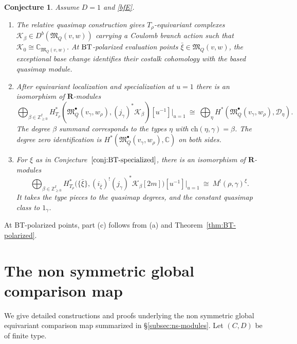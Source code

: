 \documentclass[11pt,reqno]{amsart}
\newtheorem{Conjecture}[Theorem]{Conjecture}
\theoremstyle{definition}
\theoremstyle{remark}
\def\bbC{\mathbb C}
\def\bbZ{\mathbb Z}
\def\dQ{\underline Q}
\def\bR{\mathbf R}
\def\M{\mathfrak M}
\begin{document}
\begin{Conjecture}\label{conj:BT-Microlocal}
\label{conj:BT-relative}Assume $D=1$ and \eqref{bfE}. \hfill
\begin{enumerate}[label=$\mathrm{(\alph*)}$,leftmargin=8mm]
\item
The relative quasimap construction gives $T_\rho$-equivariant complexes $\mathscr K_\beta\in D^b(\M_Q(v,w))$ 
carrying a Coulomb branch action such that $\mathscr K_0\cong\bbC_{\M_Q(v,w)}$.
At ${\rm BT}$-polarized evaluation points $\bar\xi\in \M_Q(v,w)$, the exceptional base change
identifies their costalk cohomology with the based quasimap module.
\item
After equivariant localization and specialization at $u=1$ there
is an isomorphism of $\bR$-modules
\begin{equation}\label{eq:BT-relative-microlocal}
 \bigoplus_{\beta\in\bbZ_{\geqslant0}^I}
 H^*_{T_\rho}\!\left(\M_{\dQ}^\bullet(v_\gamma,w_\rho),(j_\gamma)^*\mathscr K_\beta\right)
 [u^{-1}]\Big|_{u=1}
 \ \cong\ \bigoplus_\eta H^*(\M_{\dQ}^\bullet(v_\gamma,w_\rho),\mathcal D_\eta).
\end{equation}
The degree $\beta$ summand corresponds to the types $\eta$ with
$\mathrm{ch}(\eta,\gamma)=\beta$.
The degree zero identification is $H^*(\M_{\dQ}^\bullet(v_\gamma,w_\rho),\bbC)$ on both sides.
\item
For $\xi$ as in Conjecture~$\ref{conj:BT-specialized}$,
there is an isomorphism of $\bR$-modules
\[
 \bigoplus_{\beta\in\bbZ_{\geqslant0}^I}
 H^*_{T_\rho}\!\bigl(\{\bar\xi\},
 (i_{\bar\xi})^!(j_\gamma)^*\mathscr K_\beta[2m]\bigr)
 [u^{-1}]\Big|_{u=1}
 \ \cong\ M^!(\rho,\gamma)^\xi.
\]
It takes the type pieces to the quasimap degrees, and the constant quasimap class to $1_\gamma$.
\end{enumerate}
\end{Conjecture}


At BT-polarized points, part (c) follows from (a) and Theorem~\ref{thm:BT-polarized}.




\appendix
\section{The non symmetric global comparison map}
\label{app:ns-global-technical}
We  give detailed constructions and proofs underlying
the non symmetric global equivariant comparison map summarized in \S\ref{subsec:ns-modules}.
Let $(C,D)$ be of finite type. 
\end{document}
